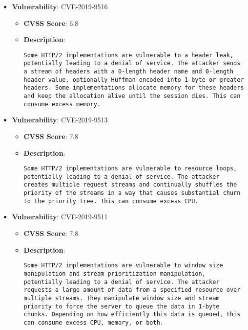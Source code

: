 \documentclass{article}
\begin{document}
\begin{itemize}
        \item \textbf{Vulnerability}: CVE-2019-9516
        \begin{itemize}
            \item \textbf{CVSS Score}:  6.8 
            \item \textbf{Description}:
            \parbox[t]{0.9\linewidth}{
                \verb|Some HTTP/2 implementations are vulnerable to a header leak, potentially leading to a denial of service. The attacker sends a stream of headers with a 0-length header name and 0-length header value, optionally Huffman encoded into 1-byte or greater headers. Some implementations allocate memory for these headers and keep the allocation alive until the session dies. This can consume excess memory.|
            }
        \end{itemize}
    
        \item \textbf{Vulnerability}: CVE-2019-9513
        \begin{itemize}
            \item \textbf{CVSS Score}:  7.8 
            \item \textbf{Description}:
            \parbox[t]{0.9\linewidth}{
                \verb|Some HTTP/2 implementations are vulnerable to resource loops, potentially leading to a denial of service. The attacker creates multiple request streams and continually shuffles the priority of the streams in a way that causes substantial churn to the priority tree. This can consume excess CPU.|
            }
        \end{itemize}
    
        \item \textbf{Vulnerability}: CVE-2019-9511
        \begin{itemize}
            \item \textbf{CVSS Score}:  7.8 
            \item \textbf{Description}:
            \parbox[t]{0.9\linewidth}{
                \verb|Some HTTP/2 implementations are vulnerable to window size manipulation and stream prioritization manipulation, potentially leading to a denial of service. The attacker requests a large amount of data from a specified resource over multiple streams. They manipulate window size and stream priority to force the server to queue the data in 1-byte chunks. Depending on how efficiently this data is queued, this can consume excess CPU, memory, or both.|
            }
        \end{itemize}
    

\end{itemize}
\end{document}
